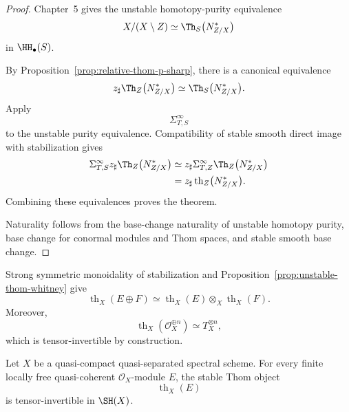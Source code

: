 \begin{proof}
Chapter~5 gives the unstable homotopy-purity equivalence
\[
    X/(X\setminus Z)
    \simeq
    \Th_S
    \bigl(
      N^*_{Z/X}
    \bigr)
\]
in \(\HH_\bullet(S)\).

By Proposition~\ref{prop:relative-thom-p-sharp}, there is a canonical
equivalence
\[
    z_\sharp
    \Th_Z
    \bigl(
      N^*_{Z/X}
    \bigr)
    \simeq
    \Th_S
    \bigl(
      N^*_{Z/X}
    \bigr).
\]
Apply
\[
    \Sigma_{T,S}^\infty
\]
to the unstable purity equivalence.  Compatibility of stable smooth direct
image with stabilization gives
\[
\begin{aligned}
    \Sigma_{T,S}^\infty
    z_\sharp
    \Th_Z
    \bigl(
      N^*_{Z/X}
    \bigr)
    &\simeq
    z_\sharp
    \Sigma_{T,Z}^\infty
    \Th_Z
    \bigl(
      N^*_{Z/X}
    \bigr) \\
    &=
    z_\sharp
    \operatorname{th}_Z
    \bigl(
      N^*_{Z/X}
    \bigr).
\end{aligned}
\]
Combining these equivalences proves the theorem.

Naturality follows from the base-change naturality of unstable homotopy
purity, base change for conormal modules and Thom spaces, and stable smooth
base change.
\end{proof}

Strong symmetric monoidality of stabilization and
Proposition~\ref{prop:unstable-thom-whitney} give
\[
    \operatorname{th}_X(E\oplus F)
    \simeq
    \operatorname{th}_X(E)\otimes_X\operatorname{th}_X(F).
\]
Moreover,
\[
    \operatorname{th}_X(\mathcal O_X^{\oplus n})
    \simeq
    T_X^{\otimes n},
\]
which is tensor-invertible by construction.

\begin{theorem}
\label{thm:thom-invertibility}
Let \(X\) be a quasi-compact quasi-separated spectral scheme.  For every
finite locally free quasi-coherent \(\mathcal O_X\)-module \(E\), the stable
Thom object
\[
    \operatorname{th}_X(E)
\]
is tensor-invertible in \(\SH(X)\).
\end{theorem}

